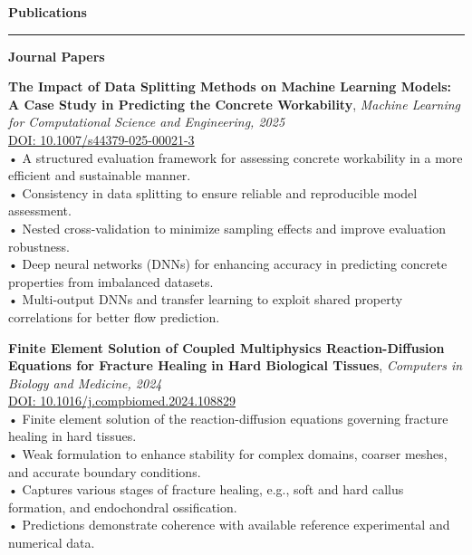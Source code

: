 \documentclass[11pt]{article}  %
\newenvironment{rSection}[1]{  %
    \vspace{0.5em}  %
    {\Large\bfseries\color{primary} #1}  %
    \vspace{0.3em}  %
    {\color{primary}\hrule height 2pt}  %
    \vspace{0.3em}  %
}{
    \vspace{0.05em}  %
}
\begin{document}
\begin{rSection}{Publications}
    \vspace{0.3em}
    
    {\color{primary}\textbf{Journal Papers}\par}
    \vspace{0.3em}
    
    \noindent\begin{minipage}{\textwidth}
        \textbf{The Impact of Data Splitting Methods on Machine Learning Models: A Case Study in Predicting the Concrete Workability}, \textit{\color{lighttext}Machine Learning for Computational Science and Engineering, 2025}\\[0.3em]
        \href{https://doi.org/10.1007/s44379-025-00021-3}{\small\color{primary}DOI: 10.1007/s44379-025-00021-3}\\[0.3em]
        \small\color{lighttext}    • A structured evaluation framework for assessing concrete workability in a more efficient and sustainable manner.\\
        \small\color{lighttext}    • Consistency in data splitting to ensure reliable and reproducible model assessment.\\
        \small\color{lighttext}    • Nested cross-validation to minimize sampling effects and improve evaluation robustness.\\
        \small\color{lighttext}    • Deep neural networks (DNNs) for enhancing accuracy in predicting concrete properties from imbalanced datasets.\\
        \small\color{lighttext}    • Multi-output DNNs and transfer learning to exploit shared property correlations for better flow prediction.\\
        \end{minipage}
    
    \noindent\begin{minipage}{\textwidth}
        \textbf{Finite Element Solution of Coupled Multiphysics Reaction-Diffusion Equations for Fracture Healing in Hard Biological Tissues}, \textit{\color{lighttext}Computers in Biology and Medicine, 2024}\\[0.3em]
        \href{https://doi.org/10.1016/j.compbiomed.2024.108829}{\small\color{primary}DOI: 10.1016/j.compbiomed.2024.108829}\\[0.3em]
        \small\color{lighttext}    • Finite element solution of the reaction-diffusion equations governing fracture healing in hard tissues.\\
        \small\color{lighttext}    • Weak formulation to enhance stability for complex domains, coarser meshes, and accurate boundary conditions.\\
        \small\color{lighttext}    • Captures various stages of fracture healing, e.g., soft and hard callus formation, and endochondral ossification.\\
        \small\color{lighttext}    • Predictions demonstrate coherence with available reference experimental and numerical data.\\
        \end{minipage}
    

\end{rSection}
\end{document}
